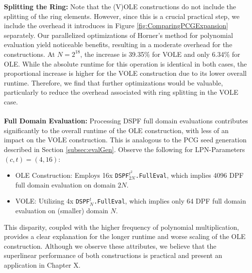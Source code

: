 \textbf{Splitting the Ring:} Note that the (V)OLE constructions do not include the splitting of the ring elements. However, since this is a crucial practical step, we include the overhead it introduces in Figure \ref{fig:ComparingPCGExpansion} separately. Our parallelized optimizations of Horner's method for polynomial evaluation yield noticeable benefits, resulting in a moderate overhead for the constructions. At $N=2^{18}$, the increase is 39.35\% for VOLE and only 6.34\% for OLE. While the absolute runtime for this operation is identical in both cases, the proportional increase is higher for the VOLE construction due to its lower overall runtime. Therefore, we find that further optimizations would be valuable, particularly to reduce the overhead associated with ring splitting in the VOLE case.
\\\\
\textbf{Full Domain Evaluation:} Processing DSPF full domain evaluations contributes significantly to the overall runtime of the OLE construction, with less of an impact on the VOLE construction. This is analogous to the PCG seed generation described in Section \ref{subsec:evalGen}. Observe the following for LPN-Parameters $(c,t)=(4,16)$:
\begin{itemize}
\item OLE Construction: Employs 16x \texttt{DSPF$^{t^2}_{2N}$.FullEval}, which implies 4096 DPF full domain evaluation on domain $2N$.
\item VOLE: Utilizing 4x \texttt{DSPF$^{t}_{N}$.FullEval}, which implies only 64 DPF full domain evaluation on (smaller) domain $N$.
\end{itemize}
This disparity, coupled with the higher frequency of polynomial multiplication, provides a clear explanation for the longer runtime and worse scaling of the OLE construction. Although we observe these attributes, we believe that the superlinear performance of both constructions is practical and present an application in Chapter X.
\\\\
